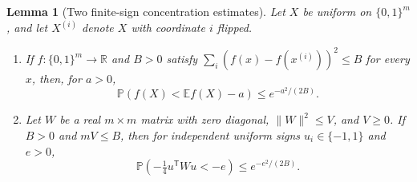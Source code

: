 \documentclass[11pt,a4paper]{article}
\newtheorem{lemma}[theorem]{Lemma}
\theoremstyle{definition}
\theoremstyle{remark}
\newcommand{\E}{\mathbb E}
\newcommand{\Prb}{\mathbb P}
\newcommand{\bits}{\{0,1\}}
\begin{document}
\begin{lemma}[Two finite-sign concentration estimates]\label{lem:counts-concentration}
Let $X$ be uniform on $\bits^m$, and let $X^{(i)}$ denote $X$ with
coordinate $i$ flipped.
\begin{enumerate}
\item If $f:\bits^m\to\mathbb R$ and $B>0$ satisfy
$\sum_i(f(x)-f(x^{(i)}))^2\le B$ for every $x$, then, for $a>0$,
\[
 \Prb(f(X)<\E f(X)-a)\le e^{-a^2/(2B)}.
\]
\item Let $W$ be a real $m\times m$ matrix with zero diagonal,
$\|W\|^2\le V$, and $V\ge0$. If $B>0$ and $mV\le B$, then for
independent uniform signs $u_i\in\{-1,1\}$ and $e>0$,
\[
 \Prb\left(-\tfrac14u^{\mathsf T}Wu<-e\right)
 \le e^{-e^2/(2B)}.
\]
\end{enumerate}
\end{lemma}
\end{document}

